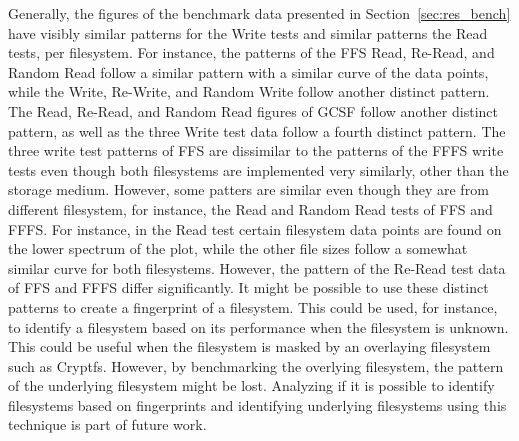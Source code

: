 Generally, the figures of the benchmark data presented in Section~\ref{sec:res_bench} have visibly similar patterns for the Write tests and similar patterns the Read tests, per filesystem. For instance, the patterns of the \gls{FFS} Read, \mbox{Re-Read}, and Random Read follow a similar pattern with a similar curve of the data points, while the Write, \mbox{Re-Write}, and Random Write follow another distinct pattern. The Read, \mbox{Re-Read}, and Random Read figures of \gls{GCSF} follow another distinct pattern, as well as the three Write test data follow a fourth distinct pattern. The three write test patterns of \gls{FFS} are dissimilar to the patterns of the \gls{FFFS} write tests even though both filesystems are implemented very similarly, other than the storage medium. However, some patters are similar even though they are from different filesystem, for instance, the Read and Random Read tests of \gls{FFS} and \gls{FFFS}. For instance, in the Read test certain filesystem data points are found on the lower spectrum of the plot, while the other file sizes follow a somewhat similar curve for both filesystems. However, the pattern of the \mbox{Re-Read} test data of \gls{FFS} and \gls{FFFS} differ significantly. It might be possible to use these distinct patterns to create a fingerprint of a filesystem. This could be used, for instance, to identify a filesystem based on its performance when the filesystem is unknown. This could be useful when the filesystem is masked by an overlaying filesystem such as Cryptfs. However, by benchmarking the overlying filesystem, the pattern of the underlying filesystem might be lost. Analyzing if it is possible to identify filesystems based on fingerprints and identifying underlying filesystems using this technique is part of future work.

